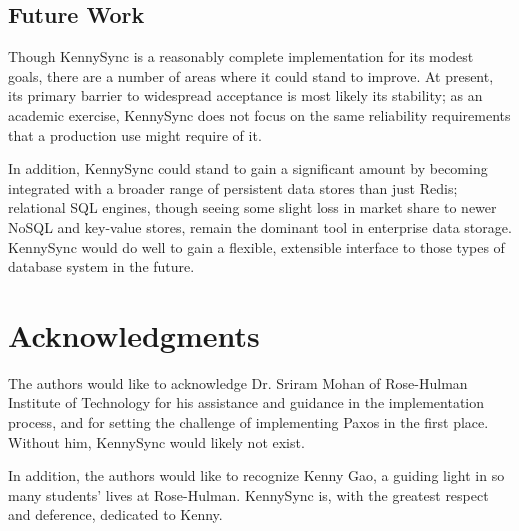 \documentclass{acm_proc_article-sp}
\begin{document}
\subsection{Future Work}

Though KennySync is a reasonably complete implementation for its modest goals,
there are a number of areas where it could stand to improve. At present, its
primary barrier to widespread acceptance is most likely its stability; as an
academic exercise, KennySync does not focus on the same reliability requirements
that a production use might require of it.

In addition, KennySync could stand to gain a significant amount by becoming
integrated with a broader range of persistent data stores than just Redis;
relational SQL engines, though seeing some slight loss in market share to newer
NoSQL and key-value stores, remain the dominant tool in enterprise data storage.
KennySync would do well to gain a flexible, extensible interface to those types
of database system in the future.

\section{Acknowledgments}

The authors would like to acknowledge Dr. Sriram Mohan of Rose-Hulman Institute
of Technology for his assistance and guidance in the implementation process, and
for setting the challenge of implementing Paxos in the first place. Without him,
KennySync would likely not exist.

In addition, the authors would like to recognize Kenny Gao, a guiding light in
so many students' lives at Rose-Hulman. KennySync is, with the greatest respect
and deference, dedicated to Kenny.

%

%
%
\balancecolumns
\end{document}

